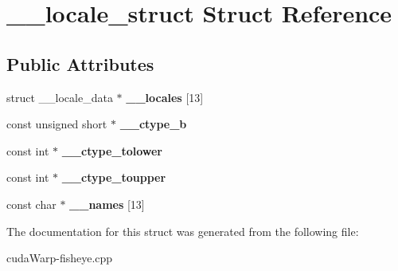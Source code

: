 \hypertarget{struct____locale__struct}{}\section{\+\_\+\+\_\+locale\+\_\+struct Struct Reference}
\label{struct____locale__struct}
\subsection*{Public Attributes}
\begin{DoxyCompactItemize}
\item 
struct \+\_\+\+\_\+locale\+\_\+data $\ast$ {\bfseries \+\_\+\+\_\+locales} \mbox{[}13\mbox{]}\hypertarget{struct____locale__struct_a65ab5e4812df2a9379c813e725f288eb}{}\label{struct____locale__struct_a65ab5e4812df2a9379c813e725f288eb}

\item 
const unsigned short $\ast$ {\bfseries \+\_\+\+\_\+ctype\+\_\+b}\hypertarget{struct____locale__struct_a41d067f835c4dd0e897e2068286d4200}{}\label{struct____locale__struct_a41d067f835c4dd0e897e2068286d4200}

\item 
const int $\ast$ {\bfseries \+\_\+\+\_\+ctype\+\_\+tolower}\hypertarget{struct____locale__struct_a458b9bc3b3d11752f0b8b0e207af9401}{}\label{struct____locale__struct_a458b9bc3b3d11752f0b8b0e207af9401}

\item 
const int $\ast$ {\bfseries \+\_\+\+\_\+ctype\+\_\+toupper}\hypertarget{struct____locale__struct_aab54d2fc142e258cdd17b83f799ae507}{}\label{struct____locale__struct_aab54d2fc142e258cdd17b83f799ae507}

\item 
const char $\ast$ {\bfseries \+\_\+\+\_\+names} \mbox{[}13\mbox{]}\hypertarget{struct____locale__struct_a3361a1d5f222a7f10b68c9ecbbf5badd}{}\label{struct____locale__struct_a3361a1d5f222a7f10b68c9ecbbf5badd}

\end{DoxyCompactItemize}


The documentation for this struct was generated from the following file\+:\begin{DoxyCompactItemize}
\item 
cuda\+Warp-\/fisheye.\+cpp\end{DoxyCompactItemize}
